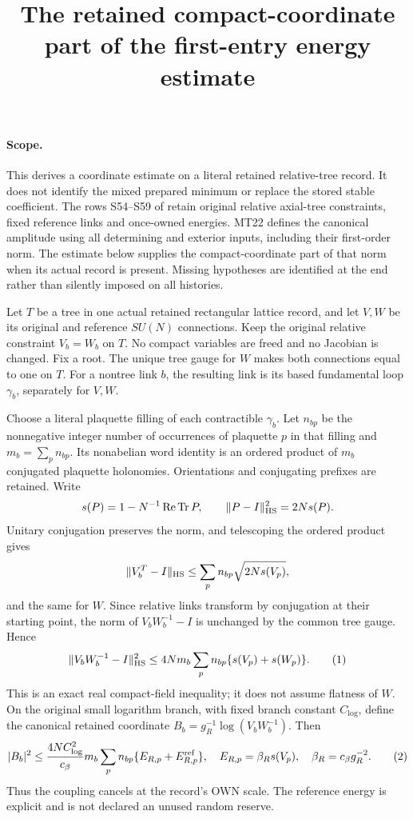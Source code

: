 \documentclass{article}
\title{The retained compact-coordinate part of the first-entry energy estimate}\author{}\date{}
\begin{document}
\maketitle
\paragraph{Scope.}
This derives a coordinate estimate on a literal retained relative-tree record. It does not identify the mixed prepared minimum or replace the stored stable coefficient. The rows S54--S59 of \cite[pp.~599--602]{W} retain original relative axial-tree constraints, fixed reference links and once-owned energies. MT22 defines the canonical amplitude using all determining and exterior inputs, including their first-order norm. The estimate below supplies the compact-coordinate part of that norm when its actual record is present. Missing hypotheses are identified at the end rather than silently imposed on all histories.

Let $T$ be a tree in one actual retained rectangular lattice record, and let $V,W$ be its original and reference $SU(N)$ connections. Keep the original relative constraint $V_b=W_b$ on $T$. No compact variables are freed and no Jacobian is changed. Fix a root. The unique tree gauge for $W$ makes both connections equal to one on $T$. For a nontree link $b$, the resulting link is its based fundamental loop $\gamma_b$, separately for $V,W$.

Choose a literal plaquette filling of each contractible $\gamma_b$. Let $n_{bp}$ be the nonnegative integer number of occurrences of plaquette $p$ in that filling and $m_b=\sum_p n_{bp}$. Its nonabelian word identity is an ordered product of $m_b$ conjugated plaquette holonomies. Orientations and conjugating prefixes are retained. Write
\[
 s(P)=1-N^{-1}\operatorname{Re}\operatorname{Tr}P,
 \qquad\|P-I\|_{\rm HS}^2=2Ns(P).
\]
Unitary conjugation preserves the norm, and telescoping the ordered product gives
\[
 \|V_b^T-I\|_{\rm HS}\le\sum_p n_{bp}\sqrt{2Ns(V_p)},
\]
and the same for $W$. Since relative links transform by conjugation at their starting point, the norm of $V_bW_b^{-1}-I$ is unchanged by the common tree gauge. Hence
\[
 \|V_bW_b^{-1}-I\|_{\rm HS}^2
 \le4N m_b\sum_p n_{bp}\{s(V_p)+s(W_p)\}.                 \tag{1}
\]
This is an exact real compact-field inequality; it does not assume flatness of $W$. On the original small logarithm branch, with fixed branch constant $C_{\log}$, define the canonical retained coordinate $B_b=g_R^{-1}\log(V_bW_b^{-1})$. Then
\[
 |B_b|^2\le \frac{4NC_{\log}^2}{c_\beta}
 m_b\sum_p n_{bp}\{E_{R,p}+E^{\rm ref}_{R,p}\},\quad
 E_{R,p}=\beta_Rs(V_p),\quad\beta_R=c_\beta g_R^{-2}.      \tag{2}
\]
Thus the coupling cancels at the record's OWN scale. The reference energy is explicit and is not declared an unused random reserve.
\end{document}
